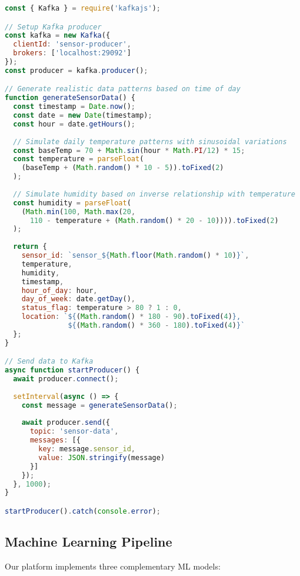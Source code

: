 \documentclass[11pt, a4paper]{article}
\newenvironment{customcode}[1]{
  \begin{tcolorbox}[
    enhanced,
    colback=codebg,
    colframe=codeframe,
    arc=0pt,
    outer arc=0pt,
    boxrule=1pt,
    left=10pt,
    right=10pt,
    top=10pt,
    bottom=10pt,
    title={#1},
    fonttitle=\sffamily\bfseries\color{mainblue},
    coltitle=white,
    colbacktitle=secondaryblue,
    attach boxed title to top left={xshift=10pt, yshift=-\tcboxedtitleheight/2},
    boxed title style={
      sharp corners,
      boxrule=0pt,
    },
  ]
}{
  \end{tcolorbox}
}
\begin{document}
\begin{customcode}{Sensor Data Generator (JavaScript)}
\begin{lstlisting}[language=JavaScript]
const { Kafka } = require('kafkajs');

// Setup Kafka producer
const kafka = new Kafka({
  clientId: 'sensor-producer',
  brokers: ['localhost:29092']
});
const producer = kafka.producer();

// Generate realistic data patterns based on time of day
function generateSensorData() {
  const timestamp = Date.now();
  const date = new Date(timestamp);
  const hour = date.getHours();
  
  // Simulate daily temperature patterns with sinusoidal variations
  const baseTemp = 70 + Math.sin(hour * Math.PI/12) * 15;
  const temperature = parseFloat(
    (baseTemp + (Math.random() * 10 - 5)).toFixed(2)
  );
  
  // Simulate humidity based on inverse relationship with temperature
  const humidity = parseFloat(
    (Math.min(100, Math.max(20, 
      110 - temperature + (Math.random() * 20 - 10)))).toFixed(2)
  );
  
  return {
    sensor_id: `sensor_${Math.floor(Math.random() * 10)}`,
    temperature,
    humidity,
    timestamp,
    hour_of_day: hour,
    day_of_week: date.getDay(),
    status_flag: temperature > 80 ? 1 : 0,
    location: `${(Math.random() * 180 - 90).toFixed(4)}, 
               ${(Math.random() * 360 - 180).toFixed(4)}`
  };
}

// Send data to Kafka
async function startProducer() {
  await producer.connect();
  
  setInterval(async () => {
    const message = generateSensorData();
    
    await producer.send({
      topic: 'sensor-data',
      messages: [{
        key: message.sensor_id,
        value: JSON.stringify(message)
      }]
    });
  }, 1000);
}

startProducer().catch(console.error);
\end{lstlisting}
\end{customcode}

\clearpage
\subsection{Machine Learning Pipeline}
Our platform implements three complementary ML models:
\end{document}
